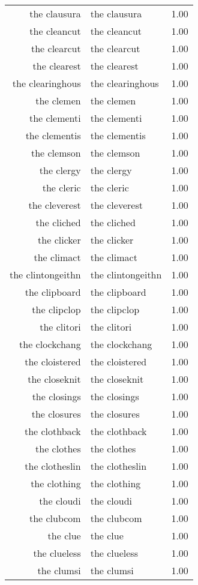 \begin{table}[ht]
\begin{tabular}{rlr}
  the clausura & the clausura & 1.00 \\ 
  the cleancut & the cleancut & 1.00 \\ 
  the clearcut & the clearcut & 1.00 \\ 
  the clearest & the clearest & 1.00 \\ 
  the clearinghous & the clearinghous & 1.00 \\ 
  the clemen & the clemen & 1.00 \\ 
  the clementi & the clementi & 1.00 \\ 
  the clementis & the clementis & 1.00 \\ 
  the clemson & the clemson & 1.00 \\ 
  the clergy & the clergy & 1.00 \\ 
  the cleric & the cleric & 1.00 \\ 
  the cleverest & the cleverest & 1.00 \\ 
  the cliched & the cliched & 1.00 \\ 
  the clicker & the clicker & 1.00 \\ 
  the climact & the climact & 1.00 \\ 
  the clintongeithn & the clintongeithn & 1.00 \\ 
  the clipboard & the clipboard & 1.00 \\ 
  the clipclop & the clipclop & 1.00 \\ 
  the clitori & the clitori & 1.00 \\ 
  the clockchang & the clockchang & 1.00 \\ 
  the cloistered & the cloistered & 1.00 \\ 
  the closeknit & the closeknit & 1.00 \\ 
  the closings & the closings & 1.00 \\ 
  the closures & the closures & 1.00 \\ 
  the clothback & the clothback & 1.00 \\ 
  the clothes & the clothes & 1.00 \\ 
  the clotheslin & the clotheslin & 1.00 \\ 
  the clothing & the clothing & 1.00 \\ 
  the cloudi & the cloudi & 1.00 \\ 
  the clubcom & the clubcom & 1.00 \\ 
  the clue & the clue & 1.00 \\ 
  the clueless & the clueless & 1.00 \\ 
  the clumsi & the clumsi & 1.00 \\ 

\end{tabular}
\end{table}

